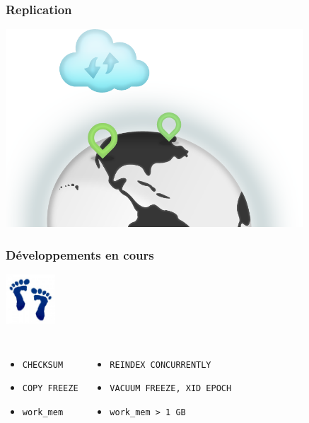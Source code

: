 \documentclass{beamer}
\begin{document}
\begin{frame}[fragile]
\begin{center}
  \frametitle{Replication}

  \includegraphics[height=20em]{Regions-Zones.png}
\end{center}
\end{frame}

\begin{frame}[fragile]
  \frametitle{Développements en cours}

  \begin{center}
  \includegraphics[height=5em]{babysteps-300x300.jpg}
  \end{center}
  \vfill

\begin{columns}[c]
  \begin{itemize}
  \item \texttt{CHECKSUM}
  \item \texttt{COPY FREEZE}
  \item \texttt{work\_mem}
  \end{itemize}

  \begin{itemize}
  \item \texttt{REINDEX CONCURRENTLY}
  \item \texttt{VACUUM FREEZE, XID EPOCH}
  \item \texttt{work\_mem > 1 GB}
  \end{itemize}
\end{columns}
\end{frame}
\end{document}
